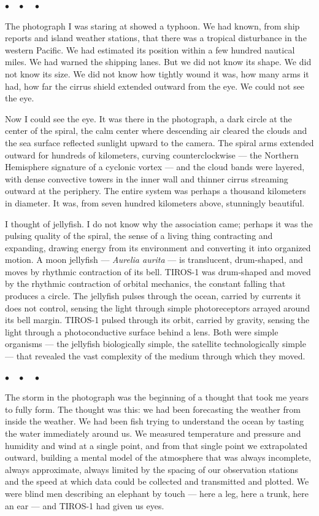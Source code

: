 \documentclass[12pt, letterpaper]{article}
\begin{document}
\begin{center}
$\bullet\quad\bullet\quad\bullet$
\end{center}

The photograph I was staring at showed a typhoon. We had known, from ship reports and island weather stations, that there was a tropical disturbance in the western Pacific. We had estimated its position within a few hundred nautical miles. We had warned the shipping lanes. But we did not know its shape. We did not know its size. We did not know how tightly wound it was, how many arms it had, how far the cirrus shield extended outward from the eye. We could not see the eye.

Now I could see the eye. It was there in the photograph, a dark circle at the center of the spiral, the calm center where descending air cleared the clouds and the sea surface reflected sunlight upward to the camera. The spiral arms extended outward for hundreds of kilometers, curving counterclockwise --- the Northern Hemisphere signature of a cyclonic vortex --- and the cloud bands were layered, with dense convective towers in the inner wall and thinner cirrus streaming outward at the periphery. The entire system was perhaps a thousand kilometers in diameter. It was, from seven hundred kilometers above, stunningly beautiful.

I thought of jellyfish. I do not know why the association came; perhaps it was the pulsing quality of the spiral, the sense of a living thing contracting and expanding, drawing energy from its environment and converting it into organized motion. A moon jellyfish --- \emph{Aurelia aurita} --- is translucent, drum-shaped, and moves by rhythmic contraction of its bell. TIROS-1 was drum-shaped and moved by the rhythmic contraction of orbital mechanics, the constant falling that produces a circle. The jellyfish pulses through the ocean, carried by currents it does not control, sensing the light through simple photoreceptors arrayed around its bell margin. TIROS-1 pulsed through its orbit, carried by gravity, sensing the light through a photoconductive surface behind a lens. Both were simple organisms --- the jellyfish biologically simple, the satellite technologically simple --- that revealed the vast complexity of the medium through which they moved.

\begin{center}
$\bullet\quad\bullet\quad\bullet$
\end{center}

The storm in the photograph was the beginning of a thought that took me years to fully form. The thought was this: we had been forecasting the weather from inside the weather. We had been fish trying to understand the ocean by tasting the water immediately around us. We measured temperature and pressure and humidity and wind at a single point, and from that single point we extrapolated outward, building a mental model of the atmosphere that was always incomplete, always approximate, always limited by the spacing of our observation stations and the speed at which data could be collected and transmitted and plotted. We were blind men describing an elephant by touch --- here a leg, here a trunk, here an ear --- and TIROS-1 had given us eyes.
\end{document}

